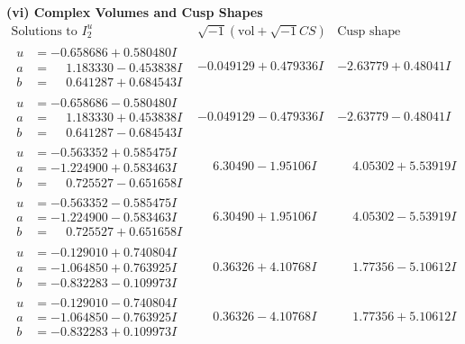 \documentclass[1p]{elsarticle_modified}
\theoremstyle{definition}
\newcommand{\I}{\sqrt{-1}}
\begin{document}
\newpage\flushleft \textbf{(vi) Complex Volumes and Cusp Shapes}
$$\begin{array}{c|c|c}  
\text{Solutions to }I^u_{2}& \I (\text{vol} + \sqrt{-1}CS) & \text{Cusp shape}\\
 \hline 
\begin{aligned}
u &= -0.658686 + 0.580480 I \\
a &= \phantom{-}1.183330 - 0.453838 I \\
b &= \phantom{-}0.641287 + 0.684543 I\end{aligned}
 & -0.049129 + 0.479336 I & -2.63779 + 0.48041 I \\ \hline\begin{aligned}
u &= -0.658686 - 0.580480 I \\
a &= \phantom{-}1.183330 + 0.453838 I \\
b &= \phantom{-}0.641287 - 0.684543 I\end{aligned}
 & -0.049129 - 0.479336 I & -2.63779 - 0.48041 I \\ \hline\begin{aligned}
u &= -0.563352 + 0.585475 I \\
a &= -1.224900 + 0.583463 I \\
b &= \phantom{-}0.725527 - 0.651658 I\end{aligned}
 & \phantom{-}6.30490 - 1.95106 I & \phantom{-}4.05302 + 5.53919 I \\ \hline\begin{aligned}
u &= -0.563352 - 0.585475 I \\
a &= -1.224900 - 0.583463 I \\
b &= \phantom{-}0.725527 + 0.651658 I\end{aligned}
 & \phantom{-}6.30490 + 1.95106 I & \phantom{-}4.05302 - 5.53919 I \\ \hline\begin{aligned}
u &= -0.129010 + 0.740804 I \\
a &= -1.064850 + 0.763925 I \\
b &= -0.832283 - 0.109973 I\end{aligned}
 & \phantom{-}0.36326 + 4.10768 I & \phantom{-}1.77356 - 5.10612 I \\ \hline\begin{aligned}
u &= -0.129010 - 0.740804 I \\
a &= -1.064850 - 0.763925 I \\
b &= -0.832283 + 0.109973 I\end{aligned}
 & \phantom{-}0.36326 - 4.10768 I & \phantom{-}1.77356 + 5.10612 I \\ \hline\begin{aligned}

\end{aligned}
\end{array}$$
\end{document}
